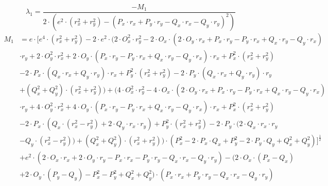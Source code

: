 \documentclass[reducespace,stylepage,semiarbeit]{spezidoc}
\begin{document}
\begin{equation*}
\lambda_1 = \dfrac{− M_1}{2 \cdot (e^{2} \cdot (r_x^{2} + r_y^{2}) - (P_x \cdot r_x + P_y \cdot r_y - Q_x \cdot r_x - Q_y \cdot r_y)^{2})}
\end{equation*}
\begin{equation*}
\begin{aligned}
M_1 &= e \cdot [e^{4} \cdot (r_x^{2} + r_y^{2}) - 2 \cdot e^{2} \cdot (2 \cdot O_x^{2} \cdot r_y^{2} - 2 \cdot O_x \cdot (2 \cdot O_y \cdot r_x + P_x \cdot r_y - P_y \cdot r_x + Q_x \cdot r_y - Q_y \cdot r_x) \\
& \cdot r_y + 2 \cdot O_y^{2} \cdot r_x^{2} + 2 \cdot O_y \cdot (P_x \cdot r_y - P_y \cdot r_x + Q_x \cdot r_y - Q_y \cdot r_x) \cdot r_x + P_x^{2} \cdot (r_x^{2} + r_y^{2}) \\
&- 2 \cdot P_x \cdot (Q_x \cdot r_x + Q_y \cdot r_y) \cdot r_x + P_y^{2} \cdot (r_x^{2} + r_y^{2}) - 2 \cdot P_y \cdot (Q_x \cdot r_x + Q_y \cdot r_y) \cdot r_y \\
&+ (Q_x^{2} + Q_y^{2}) \cdot (r_x^{2} + r_y^{2})) + (4 \cdot O_x^{2} \cdot r_y^{2} - 4 \cdot O_x \cdot (2 \cdot O_y \cdot r_x + P_x \cdot r_y - P_y \cdot r_x + Q_x \cdot r_y - Q_y \cdot r_x) \\
&\cdot r_y + 4 \cdot O_y^{2} \cdot r_x^{2} + 4 \cdot O_y \cdot (P_x \cdot r_y - P_y \cdot r_x + Q_x \cdot r_y - Q_y \cdot r_x) \cdot r_x + P_x^{2} \cdot (r_x^{2} + r_y^{2}) \\
&- 2 \cdot P_x \cdot (Q_x \cdot (r_x^{2} - r_y^{2}) + 2 \cdot Q_y \cdot r_x \cdot r_y) + P_y^{2} \cdot (r_x^{2} + r_y^{2}) - 2 \cdot P_y \cdot (2 \cdot Q_x \cdot r_x \cdot r_y \\
&- Q_y \cdot (r_x^{2} - r_y^{2})) + (Q_x^{2} + Q_y^{2}) \cdot (r_x^{2} + r_y^{2})) \cdot (P_x^{2} - 2 \cdot P_x \cdot Q_x + P_y^{2} - 2 \cdot P_y \cdot Q_y + Q_x^{2} + Q_y^{2})]^{\frac{1}{2}} \\
&+ e^{2} \cdot (2 \cdot O_x \cdot r_x + 2 \cdot O_y \cdot r_y - P_x \cdot r_x - P_y \cdot r_y - Q_x \cdot r_x - Q_y \cdot r_y) - (2 \cdot O_x \cdot (P_x - Q_x) \\
&+ 2 \cdot O_y \cdot (P_y - Q_y) - P_x^{2} - P_y^{2} + Q_x^{2} + Q_y^{2}) \cdot (P_x \cdot r_x + P_y \cdot r_y - Q_x \cdot r_x - Q_y \cdot r_y)
\end{aligned}
\end{equation*}
\end{document}
